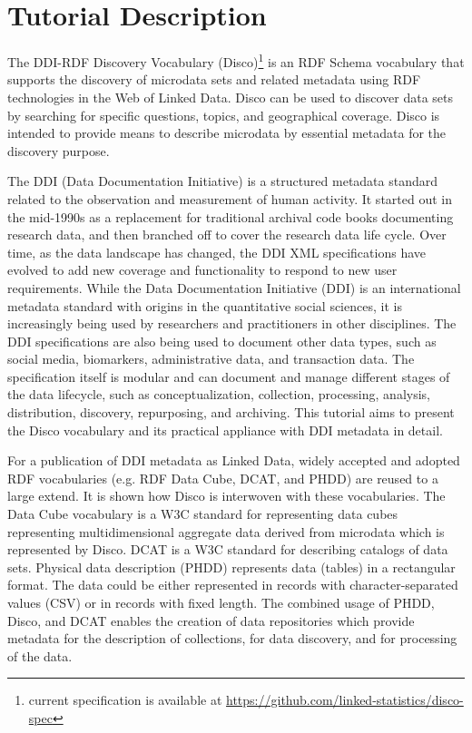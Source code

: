 \documentclass{llncs}
\begin{document}
\section{Tutorial Description}

The DDI-RDF Discovery Vocabulary (Disco)\footnote{current specification is available at \url{https://github.com/linked-statistics/disco-spec}}  is an RDF Schema vocabulary that supports the discovery of microdata sets and related metadata using RDF technologies in the Web of Linked Data. Disco can be used to discover data sets by searching for specific questions, topics, and geographical coverage. Disco is intended to provide means to describe microdata by essential metadata for the discovery purpose.
 
The DDI (Data Documentation Initiative) is a structured metadata standard related to the observation and measurement of human activity.
It started out in the mid-1990s as a replacement for traditional archival code books documenting research data, and then branched off to cover the research data life cycle. Over time, as the data landscape has
changed, the DDI XML specifications have evolved to add new coverage and functionality to respond to new user requirements.
While the Data Documentation Initiative (DDI) is an international metadata standard with origins in the quantitative social sciences, it is increasingly being used by researchers and practitioners in other disciplines. The DDI specifications are also being used to document other data types, such as social media, biomarkers, administrative data, and transaction data. The specification itself is modular and can document and manage different stages of the data lifecycle, such as conceptualization, collection, processing, analysis, distribution, discovery, repurposing, and archiving.
This tutorial aims to present the Disco vocabulary and its practical appliance with DDI metadata in detail.
 
For a publication of DDI metadata as Linked Data, widely accepted and adopted RDF vocabularies (e.g. RDF Data Cube, DCAT, and PHDD) are reused to a large extend. It is shown how Disco is interwoven with these vocabularies. The Data Cube vocabulary is a W3C standard for representing data cubes representing multidimensional aggregate data derived from microdata which is represented by Disco. DCAT is a W3C standard for describing catalogs of data sets. Physical data description (PHDD) represents data (tables) in a rectangular format. The data could be either represented in records with character-separated values (CSV) or in records with fixed length. The combined usage of PHDD, Disco, and DCAT enables the creation of data repositories which provide metadata for the description of collections, for data discovery, and for processing of the data. 
\end{document}
